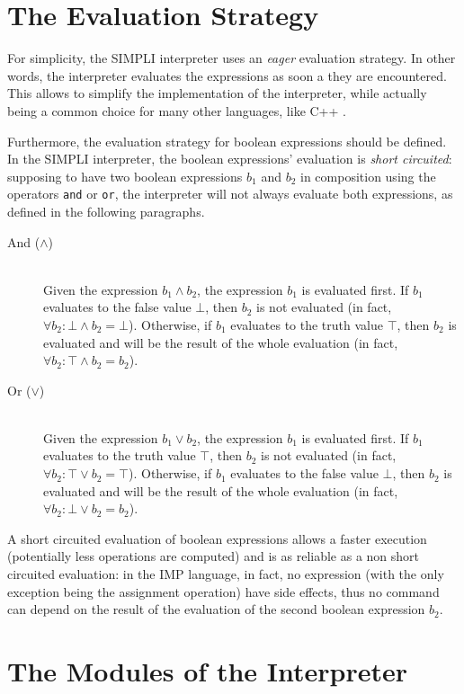 \documentclass{esposito-documentation}
\begin{document}
\section{The Evaluation Strategy}

For simplicity, the SIMPLI interpreter uses an \emph{eager} evaluation
strategy. In other words, the interpreter evaluates the expressions as soon a
they are encountered. This allows to simplify the implementation of the
interpreter, while actually being a common choice for many other languages,
like C++ \cite{Stroustrup2013}.

Furthermore, the evaluation strategy for boolean expressions should be defined.
In the SIMPLI interpreter, the boolean expressions' evaluation is \emph{short
circuited}: supposing to have two boolean expressions $b_1$ and $b_2$ in
composition using the operators \texttt{and} or \texttt{or}, the interpreter
will not always evaluate both expressions, as defined in the following
paragraphs.
\begin{description}
	\item[And ($\land$)] \hfill \\
		Given the expression $b_1 \land b_2$, the expression $b_1$ is evaluated
		first. If $b_1$ evaluates to the false value $\bot$, then $b_2$ is not
		evaluated (in fact, $\forall b_2: \bot \land b_2 = \bot$).  Otherwise,
		if $b_1$ evaluates to the truth value $\top$, then $b_2$ is evaluated
		and will be the result of the whole evaluation (in fact, $\forall b_2:
		\top\land b_2=b_2$).
	\item[Or ($\vee$)] \hfill \\
		Given the expression $b_1 \vee b_2$, the expression $b_1$ is evaluated
		first. If $b_1$ evaluates to the truth value $\top$, then $b_2$ is not
		evaluated (in fact, $\forall b_2: \top \vee b_2 = \top$).  Otherwise,
		if $b_1$ evaluates to the false value $\bot$, then $b_2$ is evaluated
		and will be the result of the whole evaluation (in fact, $\forall b_2:
		\bot\vee b_2=b_2$).
\end{description}

A short circuited evaluation of boolean expressions allows a faster execution
(potentially less operations are computed) and is as reliable as a non short
circuited evaluation: in the IMP language, in fact, no expression (with the
only exception being the assignment operation) have side effects, thus no
command can depend on the result of the evaluation of the second boolean
expression $b_2$.

\section{The Modules of the Interpreter}
\end{document}
